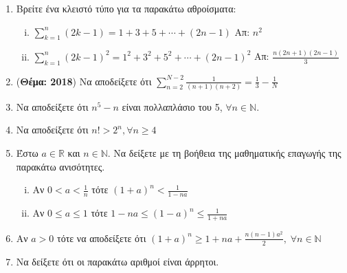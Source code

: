 \begin{enumerate}
    \item \label{ask:sums} Βρείτε ένα κλειστό τύπο για τα παρακάτω 
      αθροίσματα: 
      \begin{enumerate}[i)]
        \item $ \sum_{k=1}^{n} (2k-1) = 1 + 3 + 5 + \cdots + (2n-1)  
          $ \hfill Απ: $ n^{2} $ 

        \item $ \sum_{k=1}^{n} (2k-1)^{2} = 1^{2} + 3^{2} + 5^{2} + \cdots 
          + (2n-1)^{2}  $ \hfill Απ: $ \frac{n(2n+1)(2n-1)}{3} $ 
      \end{enumerate}

    \item \label{ask:thema18sum} ({\bfseries Θέμα: 2018}) Να αποδείξετε ότι 
      $ \sum_{n=2}^{N-2} \frac{1}{(n+1)(n+2)} = \frac{1}{3} - \frac{1}{N} $

    \item Να αποδείξετε ότι $ n^{5} - n $ είναι πολλαπλάσιο του 5,
      $ \forall n \in \mathbb{N} $.

    \item Να αποδείξετε ότι $ n! > 2^{n}, \forall n \geq 4 $

    \item Έστω $ a \in \mathbb{R} $ και $ n \in \mathbb{N} $. Να δείξετε
      με τη βοήθεια της μαθηματικής επαγωγής της παρακάτω ανισότητες.
      \begin{enumerate}[i)]
        \item Αν $ 0<a< \frac{1}{n} $ τότε $ (1+a)^{n} < \frac{1}{1-na} $
        \item Αν $ 0 \leq a \leq 1$  τότε $ 1-na \leq (1-a)^{n} \leq
          \frac{1}{1+na} $
      \end{enumerate}

    \item Αν $a > 0$ τότε να αποδείξετε ότι $ (1+a)^{n} \geq 1 + na + 
      \frac{n(n-1)a^{2}}{2},\; \forall n \in \mathbb{N}   $ 

    \item Να δείξετε ότι οι παρακάτω αριθμοί είναι άρρητοι.
  \end{enumerate}

